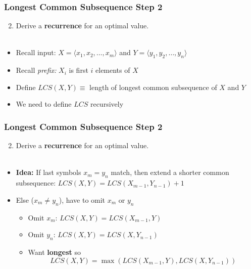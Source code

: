 \documentclass{beamer}
\newcommand{\stanza}{ \\~\ }
\begin{document}
  \begin{frame} \frametitle{Longest Common Subsequence Step 2}
    \begin{enumerate}
      \setcounter{enumi}{1}
      \item Derive a \textbf{recurrence} for an optimal value.
      \stanza
    \end{enumerate}
    \begin{itemize}
      \item Recall input: $X=\langle x_1, x_2, \ldots, x_m \rangle$ and $Y=\langle y_1, y_2, \ldots, y_n \rangle$
      \item Recall \emph{prefix:} $X_i$ is first $i$ elements of $X$
      \item Define $LCS(X, Y) \equiv$ length of longest common subsequence of $X$ and $Y$
      \item We need to define $LCS$ recursively
      \end{itemize}

      \end{frame}
      \begin{frame} \frametitle{Longest Common Subsequence Step 2}
        \begin{enumerate}
          \setcounter{enumi}{1}
          \item Derive a \textbf{recurrence} for an optimal value.
          \stanza
        \end{enumerate}
        \begin{itemize}
          \item \textbf{Idea:} If last symbols $x_m=y_n$ match, then extend a shorter common subsequence:
            $LCS(X, Y) = LCS(X_{m-1}, Y_{n-1}) + 1$
          \item Else ($x_m \ne y_n$), have to omit $x_m$ or $y_n$
            \begin{itemize}
            \item Omit $x_m$: $LCS(X, Y) = LCS(X_{m-1}, Y)$
            \item Omit $y_n$: $LCS(X, Y) = LCS(X, Y_{n-1})$
            \item Want \textbf{longest} so 
            \[ LCS(X, Y) = \max(LCS(X_{m-1}, Y), LCS(X, Y_{n-1})) \]
              \end{itemize}
          \end{itemize}
    \end{frame}
\end{document}
